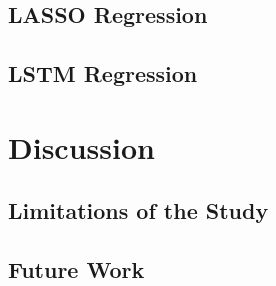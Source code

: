 \documentclass[a4paper, 11pt]{article}
\begin{document}
\subsection{LASSO Regression}

\subsection{LSTM Regression}

\section{Discussion}

\subsection{Limitations of the Study}

\subsection{Future Work}
\end{document}

